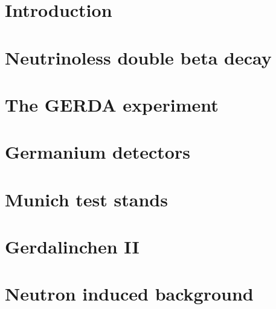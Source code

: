 \documentclass[11pt,a4paper]{book}
\begin{document}
\pagestyle{empty}



\cleardoublepage



\cleardoublepage \setcounter{page}{1} 

\tableofcontents

\cleardoublepage \setcounter{page}{1} 

\pagestyle{headings}

\chapter{Introduction}
\label{cha:intro}

\clearpage{\pagestyle{empty}\cleardoublepage}

\chapter{Neutrinoless double beta decay}
\label{cha:theory}

\clearpage{\pagestyle{empty}\cleardoublepage}

\chapter{The GERDA experiment}
\label{cha:gerda}

\clearpage{\pagestyle{empty}\cleardoublepage}

\chapter{Germanium detectors}
\label{cha:detector}

\clearpage{\pagestyle{empty}\cleardoublepage}

\chapter{Munich test stands}
\label{cha:teststand}

\clearpage{\pagestyle{empty}\cleardoublepage}

\chapter{Gerdalinchen II}
\label{cha:gerdalinchenII}

\clearpage{\pagestyle{empty}\cleardoublepage}

\chapter{Neutron induced background}
\label{cha:neutron}

\end{document}
